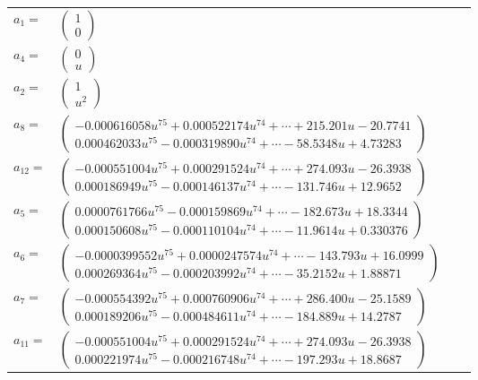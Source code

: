 \documentclass[1p]{elsarticle_modified}
\theoremstyle{definition}
\begin{document}
\begin{tabular}{m{7pt} m{180pt} m{7pt} m{180pt} }
\flushright $a_{1}=$&$\begin{pmatrix}1\\0\end{pmatrix}$ \\
\flushright $a_{4}=$&$\begin{pmatrix}0\\u\end{pmatrix}$ \\
\flushright $a_{2}=$&$\begin{pmatrix}1\\u^2\end{pmatrix}$ \\
\flushright $a_{8}=$&$\begin{pmatrix}-0.000616058 u^{75}+0.000522174 u^{74}+\cdots+215.201 u-20.7741\\0.000462033 u^{75}-0.000319890 u^{74}+\cdots-58.5348 u+4.73283\end{pmatrix}$ \\
\flushright $a_{12}=$&$\begin{pmatrix}-0.000551004 u^{75}+0.000291524 u^{74}+\cdots+274.093 u-26.3938\\0.000186949 u^{75}-0.000146137 u^{74}+\cdots-131.746 u+12.9652\end{pmatrix}$ \\
\flushright $a_{5}=$&$\begin{pmatrix}0.0000761766 u^{75}-0.000159869 u^{74}+\cdots-182.673 u+18.3344\\0.000150608 u^{75}-0.000110104 u^{74}+\cdots-11.9614 u+0.330376\end{pmatrix}$ \\
\flushright $a_{6}=$&$\begin{pmatrix}-0.0000399552 u^{75}+0.0000247574 u^{74}+\cdots-143.793 u+16.0999\\0.000269364 u^{75}-0.000203992 u^{74}+\cdots-35.2152 u+1.88871\end{pmatrix}$ \\
\flushright $a_{7}=$&$\begin{pmatrix}-0.000554392 u^{75}+0.000760906 u^{74}+\cdots+286.400 u-25.1589\\0.000189206 u^{75}-0.000484611 u^{74}+\cdots-184.889 u+14.2787\end{pmatrix}$ \\
\flushright $a_{11}=$&$\begin{pmatrix}-0.000551004 u^{75}+0.000291524 u^{74}+\cdots+274.093 u-26.3938\\0.000221974 u^{75}-0.000216748 u^{74}+\cdots-197.293 u+18.8687\end{pmatrix}$ \\

\end{tabular}
\end{document}
